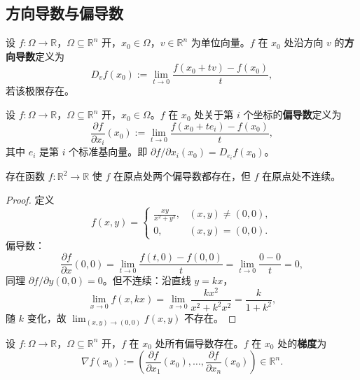\subsection{方向导数与偏导数}

\begin{definition}[方向导数]\label{def:directional_derivative}
设 $f: \Omega \to \mathbb{R}$，$\Omega \subseteq \mathbb{R}^n$ 开，$x_0 \in \Omega$，$v \in \mathbb{R}^n$ 为单位向量。$f$ 在 $x_0$ 处沿方向 $v$ 的\textbf{方向导数}定义为
\[
D_v f(x_0) := \lim_{t \to 0} \frac{f(x_0 + t v) - f(x_0)}{t},
\]
若该极限存在。
\end{definition}

\begin{definition}[偏导数]\label{def:partial_derivative_ra}
设 $f: \Omega \to \mathbb{R}$，$\Omega \subseteq \mathbb{R}^n$ 开，$x_0 \in \Omega$。$f$ 在 $x_0$ 处关于第 $i$ 个坐标的\textbf{偏导数}定义为
\[
\frac{\partial f}{\partial x_i}(x_0) := \lim_{t \to 0} \frac{f(x_0 + t e_i) - f(x_0)}{t},
\]
其中 $e_i$ 是第 $i$ 个标准基向量。即 $\partial f/\partial x_i(x_0) = D_{e_i} f(x_0)$。
\end{definition}

\begin{proposition}[偏导数存在不蕴含连续]\label{prop:partial_not_continuous}
存在函数 $f: \mathbb{R}^2 \to \mathbb{R}$ 使 $f$ 在原点处两个偏导数都存在，但 $f$ 在原点处不连续。
\end{proposition}

\begin{proof}
定义
\[
f(x, y) = \begin{cases} \frac{xy}{x^2 + y^2}, & (x, y) \neq (0, 0), \\ 0, & (x, y) = (0, 0). \end{cases}
\]
偏导数：
\[
\frac{\partial f}{\partial x}(0, 0) = \lim_{t \to 0} \frac{f(t, 0) - f(0, 0)}{t} = \lim_{t \to 0} \frac{0 - 0}{t} = 0,
\]
同理 $\partial f/\partial y(0, 0) = 0$。但不连续：沿直线 $y = kx$，
\[
\lim_{x \to 0} f(x, kx) = \lim_{x \to 0} \frac{k x^2}{x^2 + k^2 x^2} = \frac{k}{1 + k^2},
\]
随 $k$ 变化，故 $\lim_{(x, y) \to (0, 0)} f(x, y)$ 不存在。
\end{proof}

\begin{definition}[梯度]\label{def:gradient_ra}
设 $f: \Omega \to \mathbb{R}$，$\Omega \subseteq \mathbb{R}^n$ 开，$f$ 在 $x_0$ 处所有偏导数存在。$f$ 在 $x_0$ 处的\textbf{梯度}为
\[
\nabla f(x_0) := \left( \frac{\partial f}{\partial x_1}(x_0), \dots, \frac{\partial f}{\partial x_n}(x_0) \right) \in \mathbb{R}^n.
\]
\end{definition}

